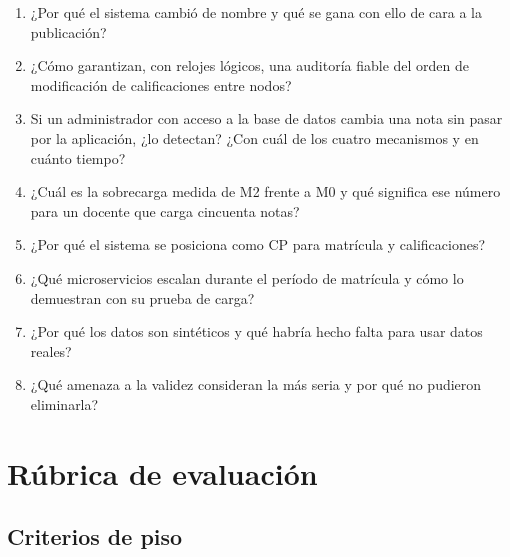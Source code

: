 \documentclass[11pt,a4paper]{article}
\begin{document}
\begin{enumerate}[leftmargin=*,itemsep=4pt]
	\item ¿Por qué el sistema cambió de nombre y qué se gana con ello de cara a la publicación?
	\item ¿Cómo garantizan, con relojes lógicos, una auditoría fiable del orden de modificación de calificaciones entre nodos?
	\item Si un administrador con acceso a la base de datos cambia una nota sin pasar por la aplicación, ¿lo detectan? ¿Con cuál de los cuatro mecanismos y en cuánto tiempo?
	\item ¿Cuál es la sobrecarga medida de M2 frente a M0 y qué significa ese número para un docente que carga cincuenta notas?
	\item ¿Por qué el sistema se posiciona como CP para matrícula y calificaciones?
	\item ¿Qué microservicios escalan durante el período de matrícula y cómo lo demuestran con su prueba de carga?
	\item ¿Por qué los datos son sintéticos y qué habría hecho falta para usar datos reales?
	\item ¿Qué amenaza a la validez consideran la más seria y por qué no pudieron eliminarla?
\end{enumerate}

\section{Rúbrica de evaluación}

\subsection{Criterios de piso}
\end{document}
